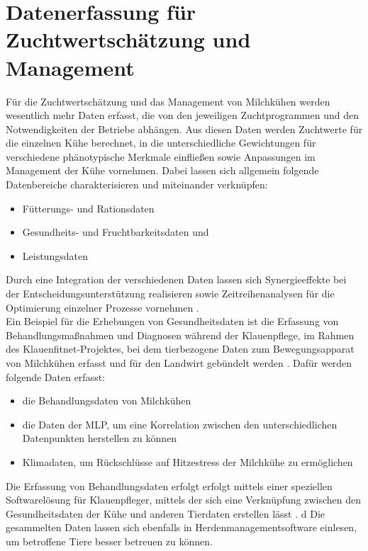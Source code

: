 \section{Datenerfassung für Zuchtwertschätzung und Management}
Für die Zuchtwertschätzung und das Management von Milchkühen werden wesentlich mehr Daten erfasst, die von den jeweiligen Zuchtprogrammen und den Notwendigkeiten der Betriebe abhängen. Aus diesen Daten werden Zuchtwerte für die einzelnen Kühe berechnet, in die unterschiedliche Gewichtungen für verschiedene phänotypische Merkmale einfließen sowie Anpassungen im Management der Kühe vornehmen. Dabei lassen sich allgemein folgende Datenbereiche charakterisieren und miteinander verknüpfen:
\begin{itemize}
	\item Fütterungs- und Rationsdaten
	\item Gesundheits- und Fruchtbarkeitsdaten und
	\item Leistungsdaten
\end{itemize}
Durch eine Integration der verschiedenen Daten lassen sich Synergieeffekte bei der Entscheidungsunterstützung realisieren sowie Zeitreihenanalysen für die Optimierung einzelner Prozesse vornehmen \autocite[4 ff]{schulze_c._hybride_2008}.\\
Ein Beispiel für die Erhebungen von Gesundheitsdaten ist die Erfassung von Behandlungsmaßnahmen und Diagnosen während der Klauenpflege, im Rahmen des Klauenfitnet-Projektes, bei dem tierbezogene Daten zum Bewegungsapparat von Milchkühen erfasst und für den Landwirt gebündelt werden \autocite{klauenfitnet_programm_????}. Dafür werden folgende Daten erfasst: 
\begin{itemize}
	\item die Behandlungsdaten von Milchkühen \autocite{klauenfitnet_bausteine_????}
	\item die Daten der MLP, um eine Korrelation zwischen den unterschiedlichen Datenpunkten herstellen zu können \autocite{klauenfitnet_bausteine_????}
	\item Klimadaten, um Rückschlüsse auf Hitzestress der Milchkühe zu ermöglichen \autocite{klauenfitnet_bausteine_????}
\end{itemize}
Die Erfassung von Behandlungsdaten erfolgt erfolgt mittels einer speziellen Softwarelösung für Klauenpfleger, mittels der sich eine Verknüpfung zwischen den Gesundheitsdaten der Kühe und anderen Tierdaten erstellen lässt \autocite{klauenfitnet_bausteine_????}. d
Die gesammelten Daten lassen sich ebenfalls in Herdenmanagementsoftware einlesen, um betroffene Tiere besser betreuen zu können.\\
